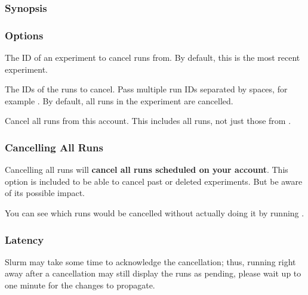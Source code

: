 \documentclass[a4paper,english]{article}
\begin{document}
\begin{adjustwidth}{18pt}{0pt}
            \subsubsection{Synopsis}
                 

            \subsubsection{Options}
                \begin{Description}[Options]
                  \item[\Arg{experiment-id}]
                    The ID of an experiment to cancel runs from.
                    By default, this is the most recent experiment.
                  \item[\OptArg{-i}{ run-ids}]
                    The IDs of the runs to cancel.
                    Pass multiple run IDs separated by spaces, for example .
                    By default, all runs in the experiment are cancelled.
                  \item[\Opt{-a, \ddash all}]
                    Cancel all runs from this account.
                    This includes all runs, not just those from .
                \end{Description}

            \subsubsection{Cancelling All Runs}
                Cancelling all runs will \textbf{cancel all runs scheduled on your account}.
                This option is included to be able to cancel past or deleted experiments.
                But be aware of its possible impact.

                You can see which runs would be cancelled without actually doing it
                by running    .

            \subsubsection{Latency}
                Slurm may take some time to acknowledge the cancellation; thus, running
                  right away after a cancellation may still display
                the runs as pending, please wait up to one minute for the changes to propagate.



\end{adjustwidth}
\end{document}
